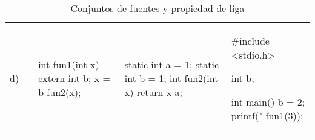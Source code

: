 \begin{table}
\begin{tabular}{m{0.2cm}|m{3cm}|m{3.5cm}|m{3.5cm}|m{3cm}}
d)
&
\begin{codecell}

\end{codecell}
&
\begin{codecell}
int fun1(int x)
{
	extern int b;
	x = b-fun2(x);
}
\end{codecell}
&
\begin{codecell}
static int 
	a = 1;
static int 
	b = 1;
int fun2(int x) 
{
	return x-a;
}
\end{codecell}
&
\begin{codecell}
#include <stdio.h>

int b;

int main()
{
	b = 2;
	printf("%
		fun1(3));
}
\end{codecell}\\

\end{tabular}
\caption{Conjuntos de fuentes y propiedad de liga}
\label{tab:fuentes}
\end{table}

